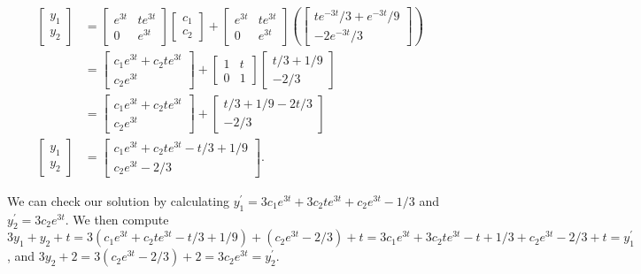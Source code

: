 \begin{align*}
\begin{bmatrix}
y_1\\
y_2
\end{bmatrix}
&=
\begin{bmatrix}
e^{3t}&te^{3t}\\
0&e^{3t}
\end{bmatrix}
\begin{bmatrix}
c_1\\
c_2
\end{bmatrix}
+
\begin{bmatrix}
e^{3t}&te^{3t}\\
0&e^{3t}
\end{bmatrix}
\left(
\begin{bmatrix}
te^{-3t}/3 +e^{-3t}/9\\
-2e^{-3t}/3
\end{bmatrix}
\right) 
\\
&=
\begin{bmatrix}
c_1e^{3t}+c_2te^{3t}\\
c_2e^{3t}
\end{bmatrix}
+
\begin{bmatrix}
1&t\\
0&1
\end{bmatrix}
\begin{bmatrix}
t/3 +1/9\\
-2/3
\end{bmatrix}
\\
&=
\begin{bmatrix}
c_1e^{3t}+c_2te^{3t}\\
c_2e^{3t}
\end{bmatrix}
+
\begin{bmatrix}
t/3+1/9-2t/3\\
-2/3
\end{bmatrix}
\\
\begin{bmatrix}
y_1\\
y_2
\end{bmatrix}
&=
\begin{bmatrix}
c_1e^{3t}+c_2te^{3t}-t/3+1/9\\
c_2e^{3t}-2/3
\end{bmatrix}
.
\end{align*}

We can check our solution by calculating $y_1^\prime = 3c_1e^{3t}+3c_2te^{3t}+c_2e^{3t}-1/3$ and $y_2^\prime = 3c_2e^{3t}$.  We then compute $3y_1+y_2+t = 3(c_1e^{3t}+c_2te^{3t}-t/3+1/9)+(c_2e^{3t}-2/3)+t =
3c_1e^{3t}+3c_2te^{3t}-t+1/3+c_2e^{3t}-2/3+t = y_1^\prime$, and $3y_2+2 =3(c_2e^{3t}-2/3)+2 = 3c_2e^{3t} = y_2^\prime$.

